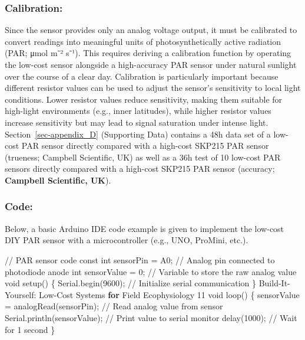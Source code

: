 \documentclass[
  11pt,
  letterpaper,
]{book}
\newenvironment{Shaded}{\begin{snugshade}}{\end{snugshade}}
\newcommand{\AttributeTok}[1]{\textcolor[rgb]{0.40,0.45,0.13}{#1}}
\newcommand{\CommentTok}[1]{\textcolor[rgb]{0.37,0.37,0.37}{#1}}
\newcommand{\ControlFlowTok}[1]{\textcolor[rgb]{0.00,0.23,0.31}{\textbf{#1}}}
\newcommand{\DataTypeTok}[1]{\textcolor[rgb]{0.68,0.00,0.00}{#1}}
\newcommand{\DecValTok}[1]{\textcolor[rgb]{0.68,0.00,0.00}{#1}}
\newcommand{\NormalTok}[1]{\textcolor[rgb]{0.00,0.23,0.31}{#1}}
\newcommand{\OperatorTok}[1]{\textcolor[rgb]{0.37,0.37,0.37}{#1}}
\begin{document}
\subsubsection{Calibration:}\label{sec-par-sensor-calibration}

Since the sensor provides only an analog voltage output, it must be
calibrated to convert readings into meaningful units of
photosynthetically active radiation (PAR; μmol m⁻² s⁻¹). This requires
deriving a calibration function by operating the low-cost sensor
alongside a high-accuracy PAR sensor under natural sunlight over the
course of a clear day. Calibration is particularly important because
different resistor values can be used to adjust the sensor's sensitivity
to local light conditions. Lower resistor values reduce sensitivity,
making them suitable for high-light environments (e.g., inner
latitudes), while higher resistor values increase sensitivity but may
lead to signal saturation under intense light.
Section~\ref{sec-appendix_D} (Supporting Data) contains a 48h data set
of a low-cost PAR sensor directly compared with a high-cost SKP215 PAR
sensor (trueness; Campbell Scientific, UK) as well as a 36h test of 10
low-cost PAR sensors directly compared with a high-cost SKP215 PAR
sensor (accuracy; \textbf{Campbell Scientific, UK}).

\subsubsection{Code:}\label{sec-par-sensor-code}

Below, a basic Arduino IDE code example is given to implement the
low-cost DIY PAR sensor with a microcontroller (e.g., UNO, ProMini,
etc.).

\begin{Shaded}
\begin{Highlighting}[]
\CommentTok{// PAR sensor code}
\AttributeTok{const} \DataTypeTok{int}\NormalTok{ sensorPin }\OperatorTok{=}\NormalTok{ A0}\OperatorTok{;} \CommentTok{// Analog pin connected to photodiode anode}
\DataTypeTok{int}\NormalTok{ sensorValue }\OperatorTok{=} \DecValTok{0}\OperatorTok{;} \CommentTok{// Variable to store the raw analog value}
\DataTypeTok{void}\NormalTok{ setup}\OperatorTok{()} \OperatorTok{\{}
\NormalTok{Serial}\OperatorTok{.}\NormalTok{begin}\OperatorTok{(}\DecValTok{9600}\OperatorTok{);} \CommentTok{// Initialize serial communication}
\OperatorTok{\}}
\NormalTok{Build}\OperatorTok{{-}}\NormalTok{It}\OperatorTok{{-}}\NormalTok{Yourself}\OperatorTok{:}\NormalTok{ Low}\OperatorTok{{-}}\NormalTok{Cost Systems }\ControlFlowTok{for}\NormalTok{ Field Ecophysiology}
\DecValTok{11}
\DataTypeTok{void}\NormalTok{ loop}\OperatorTok{()} \OperatorTok{\{}
\NormalTok{sensorValue }\OperatorTok{=}\NormalTok{ analogRead}\OperatorTok{(}\NormalTok{sensorPin}\OperatorTok{);} \CommentTok{// Read analog value from sensor}
\NormalTok{Serial}\OperatorTok{.}\NormalTok{println}\OperatorTok{(}\NormalTok{sensorValue}\OperatorTok{);} \CommentTok{// Print value to serial monitor}
\NormalTok{delay}\OperatorTok{(}\DecValTok{1000}\OperatorTok{);} \CommentTok{// Wait for 1 second}
\OperatorTok{\}}
\end{Highlighting}
\end{Shaded}
\end{document}
